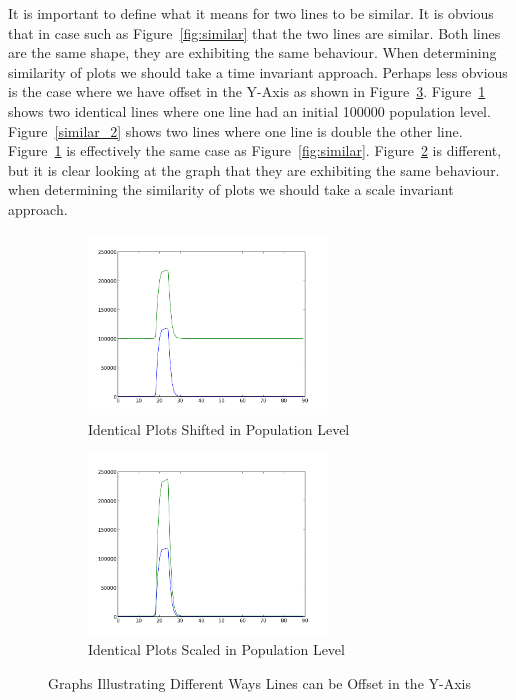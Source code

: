 It is important to define what it means for two lines to be similar.  It is obvious that in case such as Figure~\ref{fig:similar} that the two lines are similar.  Both lines are the same shape, they are exhibiting the same behaviour.  When determining similarity of plots we should take a time invariant approach.  Perhaps less obvious is the case where we have offset in the Y-Axis as shown in Figure~\ref{fig:similar_y}.  Figure~\ref{fig:similar_1} shows two identical lines where one line had an initial 100000 population level.  Figure~\ref{similar_2} shows two lines where one line is double the other line.  Figure~\ref{fig:similar_1} is effectively the same case as Figure~\ref{fig:similar}.  Figure~\ref{fig:similar_2} is different, but it is clear looking at the graph that they are exhibiting the same behaviour.  when determining the similarity of plots we should take a scale invariant approach. 

\begin{figure}[h!]
    \centering
    \begin{subfigure}[b]{0.6\textwidth}
        \centering
        \includegraphics[width=0.7\textwidth]{images/similar_plots_2.png}
        \caption{Identical Plots Shifted in Population Level}
        \label{fig:similar_1}
    \end{subfigure}

    \begin{subfigure}[b]{0.6\textwidth}
        \centering
        \includegraphics[width=0.7\textwidth]{images/similar_plots_3.png}
        \caption{Identical Plots Scaled in Population Level}
        \label{fig:similar_2}
    \end{subfigure}
    \caption{Graphs Illustrating Different Ways Lines can be Offset in the Y-Axis}
    \label{fig:similar_y}
\end{figure}

